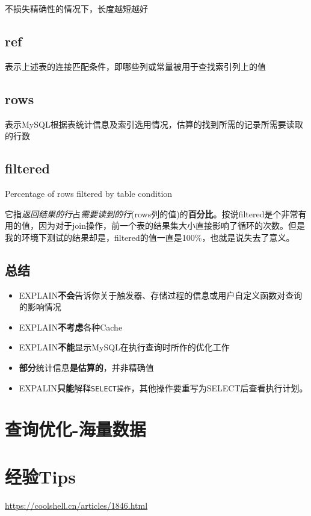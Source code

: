 \documentclass[UTF8,a4paper,12pt]{ctexbook}
\begin{document}
			不损失精确性的情况下，长度越短越好 
			
		\subsection{ref}
			表示上述表的连接匹配条件，即哪些列或常量被用于查找索引列上的值
			
		\subsection{rows}
			表示MySQL根据表统计信息及索引选用情况，估算的找到所需的记录所需要读取的行数
	
		\subsection{filtered}
			Percentage of rows filtered by table condition
			
			它指\textit{返回结果的行}占\textit{需要读到的行}(rows列的值)的\textbf{百分比}。按说filtered是个非常有用的值，因为对于join操作，前一个表的结果集大小直接影响了循环的次数。但是我的环境下测试的结果却是，filtered的值一直是100\%，也就是说失去了意义。
			
		\subsection{总结}
			\begin{itemize}
				\item EXPLAIN\textbf{不会}告诉你关于触发器、存储过程的信息或用户自定义函数对查询的影响情况
				\item EXPLAIN\textbf{不考虑}各种Cache
				\item EXPLAIN\textbf{不能}显示MySQL在执行查询时所作的优化工作
				\item \textbf{部分}统计信息\textbf{是估算的}，并非精确值
				\item EXPALIN\textbf{只能}解释\verb|SELECT操作|，其他操作要重写为SELECT后查看执行计划。
			\end{itemize}
			

	\section{查询优化-海量数据}
	
	\section{经验Tips}
		\url{https://coolshell.cn/articles/1846.html}
		
\end{document}
